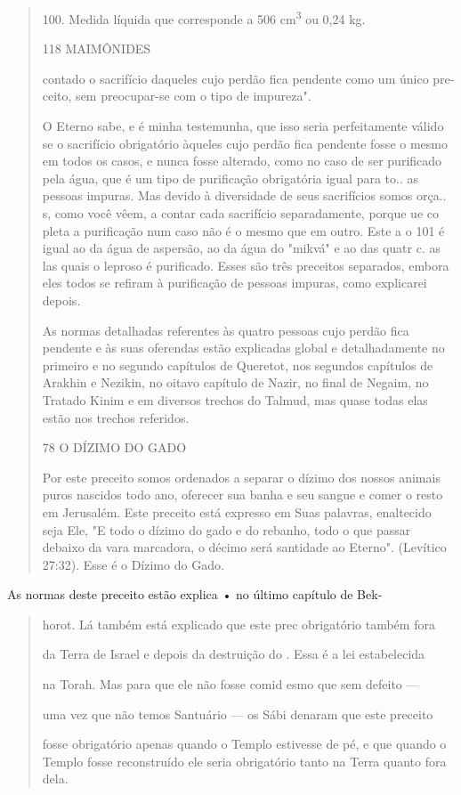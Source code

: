 \begin{quote}
100. Medida líquida que corresponde a 506 cm\textsuperscript{3} ou 0,24
kg.

118 MAIMÔNIDES

contado o sacrifício daqueles cujo perdão fica pendente como um único
pre­ceito, sem preocupar-se com o tipo de impureza".

O Eterno sabe, e é minha testemunha, que isso seria perfeitamente válido
se o sacrifício obrigatório àqueles cujo perdão fica pendente fosse o
mes­mo em todos os casos, e nunca fosse alterado, como no caso de ser
purificado pela água, que é um tipo de purificação obrigatória igual
para to.. as pessoas impuras. Mas devido à diversidade de seus
sacrifícios somos orça.. s, como você vêem, a contar cada sacrifício
separadamente, porque ue co pleta a purificação num caso não é o mesmo
que em outro. Este a o 101 é igual ao da água de aspersão, ao da água do
"mikvá" e ao das quatr c. as las quais o leproso é purificado. Esses são
três preceitos separados, embora eles todos se refiram à purificação de
pessoas impuras, como explicarei depois.

As normas detalhadas referentes às quatro pessoas cujo perdão fica
pendente e às suas oferendas estão explicadas global e detalhadamente no
pri­meiro e no segundo capítulos de Queretot, nos segundos capítulos de
Arakhin e Nezikin, no oitavo capítulo de Nazir, no final de Negaim, no
Tratado Kinim e em diversos trechos do Talmud, mas quase todas elas
estão nos trechos referidos.

78 O DÍZIMO DO GADO

Por este preceito somos ordenados a separar o dízimo dos nossos animais
puros nascidos todo ano, oferecer sua banha e seu sangue e comer o resto
em Jerusalém. Este preceito está expresso em Suas palavras, enaltecido
seja Ele, "E todo o dízimo do gado e do rebanho, todo o que passar
debaixo da vara marcadora, o décimo será santidade ao Eterno". (Levítico
27:32). Esse é o Dízimo do Gado.
\end{quote}

As normas deste preceito estão explica • no último capítulo de Bek-

\begin{quote}
horot. Lá também está explicado que este prec obrigatório também fora

da Terra de Israel e depois da destruição do . Essa é a lei estabelecida

na Torah. Mas para que ele não fosse comid esmo que sem defeito ---

uma vez que não temos Santuário --- os Sábi denaram que este preceito

fosse obrigatório apenas quando o Templo estivesse de pé, e que quando o
Tem­plo fosse reconstruído ele seria obrigatório tanto na Terra quanto
fora dela.
\end{quote}


